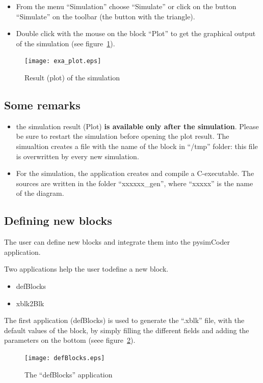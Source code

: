 \begin{itemize}
\item From the menu ``Simulation'' choose ``Simulate'' or click on the button 
``Simulate'' on the toolbar (the button with the triangle).
\item Double click with the mouse on the block ``Plot'' to get the graphical 
output of the simulation (see figure~\ref{Fig:exaplot}).
\end{itemize}

\begin{figure}[htbp]	%
\centering
\texttt{[image: exa\_plot.eps]}
\caption{Result (plot) of the simulation}
\label{Fig:exaplot}
\end{figure}

\subsection{Some remarks}
\begin{itemize}
\item the simulation result (Plot) \textbf{is available only after the 
simulation}. Please be sure to restart the simulation before opening the plot 
result. The simualtion creates a file with the name of the block in ``/tmp'' 
folder: this file is overwritten by every new simulation.
\item For the simulation, the application creates and compile a C-executable. 
The sources are written in the folder ``xxxxxx\_gen'', where ``xxxxx'' is the 
name of the diagram.
\end{itemize}

\subsection{Defining new blocks}
The user can define new blocks and integrate them into the pysimCoder application.

Two applications help the user todefine a new block.

\begin{itemize}
\item defBlocks
\item xblk2Blk
\end{itemize}

The first application (defBlocks) is used to generate the ``.xblk'' file, with the default values of the block, by simply filling the different fields and adding the parameters on the bottom (seee figure~\ref{Fig:defBlocks}).

\begin{figure}[htbp]	%
\centering
\texttt{[image: defBlocks.eps]}
\caption{The ``defBlocks'' application}
\label{Fig:defBlocks}
\end{figure}

